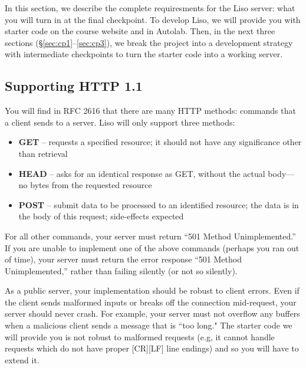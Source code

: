 \label{sec:liso}

In this section, we describe the complete requiresments for the Liso server: what you will turn in at the final checkpoint. 
To develop Liso, we will provide you with starter code on the course website and in Autolab. 
Then, in the next three sections (\S\ref{sec:cp1}--\ref{sec:cp3}), we break the project into a development strategy with intermediate checkpoints to turn the starter code into a working server.


\subsection{Supporting HTTP 1.1}
You will find in RFC 2616 that there are many HTTP methods: commands that a client sends to a server.
Liso will only support three methods:

\begin{itemize}
\item \textbf{GET} -- requests a specified resource; it should not have any
                       significance other than retrieval
\item \textbf{HEAD} -- asks for an identical response as GET, without the actual
                       body---no bytes from the requested resource
\item \textbf{POST} -- submit data to be processed to an identified resource;
                       the data is in the body of this request; side-effects
                       expected
\end{itemize}

For all other commands, your server must return ``501 Method Unimplemented.'' 
If
you are unable to implement one of the above commands (perhaps you ran out of
time), your server must return the error response ``501 Method Unimplemented,''
rather than failing silently (or not so silently).  

\vspace{5pt}

 As a public server, your implementation should be
robust to client errors. 
Even if the client sends malformed inputs or breaks off the connection mid-request, your server should never crash.
For example, your server must not
overflow any buffers when a malicious client sends a message that is ``too long." 
The starter code we will provide you is not robust to malformed requests (e.g, it cannot handle requests which do not have proper [CR][LF] line endings) and so you will have to extend it.

